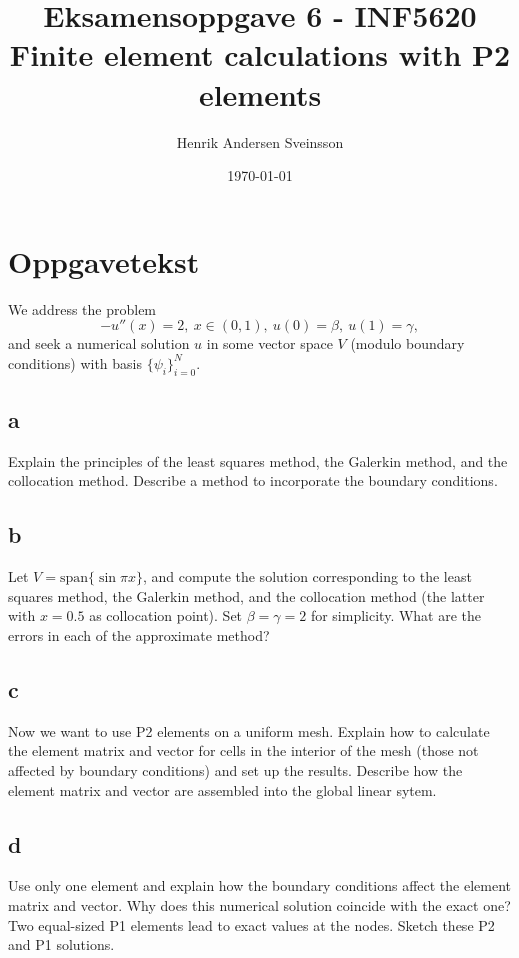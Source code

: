 \documentclass[a4paper, 10pt]{article}
\author{Henrik Andersen Sveinsson}
\title{Eksamensoppgave 6 - INF5620 \\ \large Finite element calculations with P2 elements }
\date{\today}
\begin{document}
\maketitle

\section{Oppgavetekst}
 We address the problem
\begin{equation}
−u''(x)=2, \ x \in (0,1), \ u(0)=\beta, \ u(1)=\gamma,
\end{equation}
and seek a numerical solution $u$ in some vector space $V$ (modulo boundary conditions) with basis $\{\psi_i\}^N_{i=0}$.

\subsection*{a} Explain the principles of the least squares method, the Galerkin method, and the collocation method. Describe a method to incorporate the boundary conditions.

\subsection*{b} Let $V=\mbox{span}\{\sin\pi x\}$, and compute the solution corresponding to the least squares method, the Galerkin method, and the collocation method (the latter with $x=0.5$ as collocation point). Set $\beta=\gamma=2$ for simplicity. What are the errors in each of the approximate method?

\subsection*{c} Now we want to use P2 elements on a uniform mesh. Explain how to calculate the element matrix and vector for cells in the interior of the mesh (those not affected by boundary conditions) and set up the results. Describe how the element matrix and vector are assembled into the global linear sytem.

\subsection*{d} Use only one element and explain how the boundary conditions affect the element matrix and vector. Why does this numerical solution coincide with the exact one? Two equal-sized P1 elements lead to exact values at the nodes. Sketch these P2 and P1 solutions.
\end{document}
